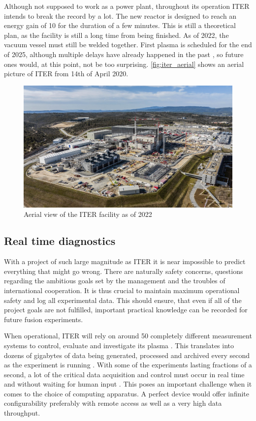 	Although not supposed to work as a power plant, 
	throughout its operation ITER intends to break the record by a lot.
	The new reactor is designed to reach an energy gain of 10 
	for the duration of a few minutes. This is still a theoretical
	plan, as the facility is still a long time from being finished.
	As of 2022, the vacuum vessel must still be welded together\cite{iter_timeline}.
	First plasma is scheduled for the end of 2025\cite{iter_timeline},
	although multiple delays have already happened in the past \cite{iter_delays},
	so future ones would, at this point, not be too surprising. 
	\autoref{fig:iter_aerial} shows an aerial picture of ITER from 14th of April 2020.
	\begin{figure}[H]
	  \centering
	  \includegraphics[width=.8\linewidth]{media/iter_aerial_2022.jpg}
	  \caption{Aerial view of the ITER facility as of 2022\cite{iter_website}}
	  \label{fig:iter_aerial}
	\end{figure}

\subsection{Real time diagnostics}

	With a project of such large magnitude as ITER it is near impossible to predict
	everything that might go wrong. There are naturally safety concerns,
	questions regarding the ambitious goals set by the management and
	the troubles of international cooperation\cite{iter_delays}.
	It is thus crucial to maintain maximum operational safety 
	and log all experimental data. This should ensure, that even if all
	of the project goals are not fulfilled, important practical knowledge
	can be recorded for future fusion experiments.


	When operational, ITER will rely on around 50 completely different
	measurement systems to control, evaluate and investigate its plasma 
	\cite{iter_diagnostics_count}.
	This translates into dozens of gigabytes of data being generated, 
	processed and archived every second as the experiment is running 
	\cite{iter_data_throughput}.
	With some of the experiments lasting fractions of a second,
	a lot of the critical data acquisition and control must occur
	in real time and without waiting for human input 
	\cite{iter_realtime_processing}.
	This poses an important challenge when it comes to the choice
	of computing apparatus. A perfect device would offer
	infinite configurability preferably with remote access 
	as well as a very high data throughput. 


